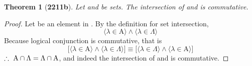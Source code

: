 \documentclass[preview]{standalone}
\newtheorem*{theorem*}{Theorem}
\begin{document}
\begin{theorem*}[\textbf{2211b}] \color{black}
    Let  and \bm{$\Lambda$} be sets. 
    The intersection of  and \bm{$\Lambda$} is commutative.
\end{theorem*}
\begin{proof} \color{black}
    Let \bm{$\lambda$} be an element in . 
    By the definition for set intersection, 
    \begin{equation*}
        \Big \langle \lambda \in \mathrm{A} \Big \rangle 
            \land 
        \Big \langle \lambda \in \Lambda \Big \rangle
    \end{equation*}
    Because logical conjunction is commutative, that is
    \begin{equation*}
        \Bigg[
            \Big \langle \lambda \in \mathrm{A} \Big \rangle 
                \land 
            \Big \langle \lambda \in \Lambda \Big \rangle
        \Bigg]
            \equiv
        \Bigg[
            \Big \langle \lambda \in \Lambda \Big \rangle 
                \land 
            \Big \langle \lambda \in \mathrm{A} \Big \rangle
        \Bigg]
    \end{equation*}
    $\therefore \text{\space} 
    \relax{\mathrm{A} \cap \Lambda = \Lambda \cap \mathrm{A}}$, 
    and indeed the intersection of  and \bm{$\Lambda$} is commutative.
\color{lightgray} \end{proof}
\end{document}
